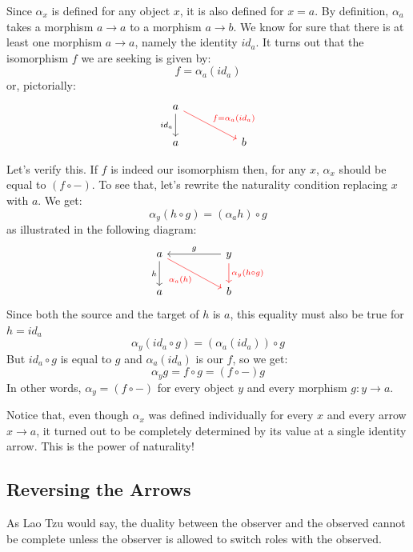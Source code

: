 \documentclass[DaoFP]{subfiles}
\begin{document}
Since $\alpha_x$ is defined for any object $x$, it is also defined for $x = a$. By definition, $\alpha_a$ takes a morphism $a \to a$ to a morphism $a \to b$. We know for sure that there is at least one morphism $a \to a$, namely the identity $id_a$. It turns out that the isomorphism $f$ we are seeking is given by:
\[f = \alpha_a (id_a)\]
or, pictorially:
\[
 \begin{tikzcd}
a
 \arrow[d, "id_a"']
 \arrow[rrd, red, "f = \alpha_a (id_a)"]
  \\
 a
  && b
 \end{tikzcd}
\]

Let's verify this. If $f$ is indeed our isomorphism then, for any $x$, $\alpha_x$ should be equal to  $(f \circ -)$. To see that, let's rewrite the naturality condition replacing $x$ with $a$. We get:
\[\alpha_y(h \circ g) = (\alpha_a h) \circ g \]
as illustrated in the following diagram:
\[
 \begin{tikzcd}
 a
 \arrow[d, "h"']
 \arrow[rrd,  red, "\alpha_a (h)"']
 && y
 \arrow[ll, "g"']
 \arrow[d, red, "\alpha_y (h \circ g)"]
   \\
 a
  && b
 \end{tikzcd}
\]
Since both the source and the target of $h$ is $a$, this equality must also be true for $h = id_a$
\[\alpha_y (id_a \circ g) = (\alpha_a (id_a)) \circ g \]
But $id_a \circ g$ is equal to $g$ and $\alpha_a(id_a)$ is our $f$, so we get:
\[\alpha_y g = f \circ g = (f \circ -) g\]
In other words, $\alpha_y = (f \circ -)$ for every object $y$ and every morphism $g \colon y \to a$.

Notice that, even though $\alpha_x$ was defined individually for every $x$ and every arrow $x \to a$, it turned out to be completely determined by its value at a single identity arrow. This is the power of naturality!
\subsection{Reversing the Arrows}
As Lao Tzu would say, the duality between the observer and the observed cannot be complete unless the observer is allowed to switch roles with the observed. 
\end{document}
